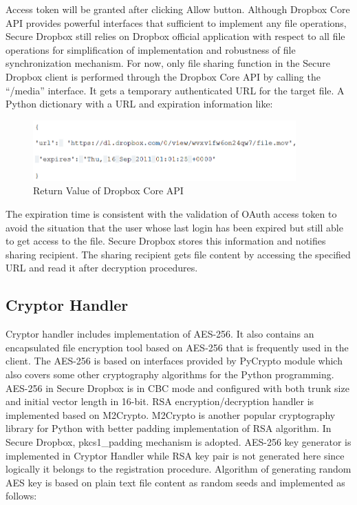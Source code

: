 Access token will be granted after clicking Allow button. Although Dropbox Core API provides powerful interfaces that sufficient to implement any file operations, Secure Dropbox still relies on Dropbox official application with respect to all file operations for simplification of implementation and robustness of file synchronization mechanism. For now, only file sharing function in the Secure Dropbox client is performed through the Dropbox Core API by calling the ``/media'' interface. It gets a temporary authenticated URL for the target file. A Python dictionary with a URL and expiration information like:

\begin{figure}[!h]
        \centering
        \includegraphics[width=0.9\textwidth]{figures/Return_Value_of_Dropbox_Sharing_API.png}
        \caption[Return Value of Dropbox Core API] {Return Value of Dropbox Core API}
\end{figure}

The expiration time is consistent with the validation of OAuth access token to avoid the situation that the user whose last login has been expired but still able to get access to the file. Secure Dropbox stores this information and notifies sharing recipient. The sharing recipient gets file content by accessing the specified URL and read it after decryption procedures.

\subsection{Cryptor Handler}

Cryptor handler includes implementation of AES-256. It also contains an encapsulated file encryption tool based on AES-256 that is frequently used in the client. The AES-256 is based on interfaces provided by PyCrypto module which also covers some other cryptography algorithms for the Python programming. AES-256 in Secure Dropbox is in CBC mode and configured with both trunk size and initial vector length in 16-bit. RSA encryption/decryption handler is implemented based on M2Crypto. M2Crypto is another popular cryptography library for Python with better padding implementation of RSA algorithm. In Secure Dropbox, pkcs1\_padding mechanism is adopted. AES-256 key generator is implemented in Cryptor Handler while RSA key pair is not generated here since logically it belongs to the registration procedure. Algorithm of generating random AES key is based on plain text file content as random seeds and implemented as follows:

